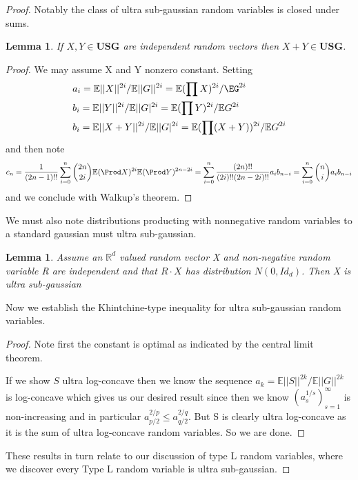 \documentclass[10pt]{article}
\newcommand{\E}{\mathbb{E}}
\newcommand{\1}{\textbf{1}}
\newcommand{\R}{\mathbb{R}}
\newtheorem{lemma}[theorem]{Lemma}
\theoremstyle{remark}
\theoremstyle{definition}
\begin{document}
\begin{proof}
Notably the class of ultra sub-gaussian random variables is closed under sums.

\begin{lemma}
	If $X,Y \in \textbf{USG}$ are independent random vectors then $X+Y \in \textbf{USG}$.
\end{lemma}

\begin{proof}
	We may assume X and Y nonzero constant. Setting
	\begin{align*}
		&a_i = \E||X||^{2i}/\E||G||^{2i} = \E(\prod X)^{2i}/\EG^{2i}\\
		&b_i = \E||Y||^{2i}/\E||G|^{2i} = \E(\prod Y)^{2i}/\E G^{2i}\\
		&b_i = \E||X+Y||^{2i}/\E||G|^{2i} = \E(\prod (X+Y))^{2i}/\E G^{2i}
	\end{align*}
	and then note
	\begin{align*}
		c_n  = \frac{1}{(2n-1)!!}\sum_{i=0}^{n}{2n \choose 2i} \E(\Prod X)^{2i} \E(\Prod Y)^{2n - 2i} = \sum_{i=0}^n \frac{(2n)!!}{(2i)!!(2n-2i)!!}a_ib_{n-i} = \sum_{i=0}^n {n \choose i}a_i b_{n-i}
	\end{align*}
	and we conclude with Walkup's theorem.
\end{proof}

We must also note distributions producting with nonnegative random variables to a standard gaussian must ultra sub-gaussian.

\begin{lemma}
	Assume an $\R^d$ valued random vector X and non-negative random variable R are independent and that $R \cdot X$ has distribution $N(0,I d_d)$. Then X is ultra sub-gaussian
\end{lemma}

Now we establish the Khintchine-type inequality for ultra sub-gaussian random variables.

\begin{proof}
	Note first the constant is optimal as indicated by the central limit theorem.

	If we show $S$ ultra log-concave then we know the sequence $a_k = \E||S||^{2k}/\E||G||^{2k}$ is log-concave which gives us our desired result since then we know $(a_s^{1/s})_{s=1}^{\infty}$ is non-increasing and in particular $a_{p/2}^{2/p} \leq a_{q/2}^{2/q}$. But S is clearly ultra log-concave as it is the sum of ultra log-concave random variables. So we are done.
\end{proof}

These results in turn relate to our discussion of type L random variables, where we discover every Type L random variable is ultra sub-gaussian.


\end{proof}
\end{document}

